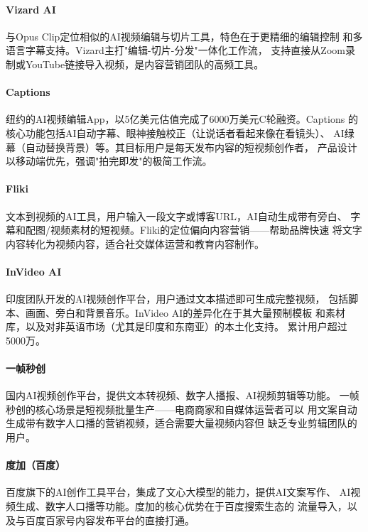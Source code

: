 \paragraph{Vizard AI}
与Opus Clip定位相似的AI视频编辑与切片工具，特色在于更精细的编辑控制
和多语言字幕支持。Vizard主打"编辑-切片-分发"一体化工作流，
支持直接从Zoom录制或YouTube链接导入视频，是内容营销团队的高频工具。

\paragraph{Captions}
纽约的AI视频编辑App，以5亿美元估值完成了6000万美元C轮融资。Captions
的核心功能包括AI自动字幕、眼神接触校正（让说话者看起来像在看镜头）、
AI绿幕（自动替换背景）等。其目标用户是每天发布内容的短视频创作者，
产品设计以移动端优先，强调"拍完即发"的极简工作流。

\paragraph{Fliki}
文本到视频的AI工具，用户输入一段文字或博客URL，AI自动生成带有旁白、
字幕和配图/视频素材的短视频。Fliki的定位偏向内容营销——帮助品牌快速
将文字内容转化为视频内容，适合社交媒体运营和教育内容制作。

\paragraph{InVideo AI}
印度团队开发的AI视频创作平台，用户通过文本描述即可生成完整视频，
包括脚本、画面、旁白和背景音乐。InVideo AI的差异化在于其大量预制模板
和素材库，以及对非英语市场（尤其是印度和东南亚）的本土化支持。
累计用户超过5000万。

\paragraph{一帧秒创}
国内AI视频创作平台，提供文本转视频、数字人播报、AI视频剪辑等功能。
一帧秒创的核心场景是短视频批量生产——电商商家和自媒体运营者可以
用文案自动生成带有数字人口播的营销视频，适合需要大量视频内容但
缺乏专业剪辑团队的用户。

\paragraph{度加（百度）}
百度旗下的AI创作工具平台，集成了文心大模型的能力，提供AI文案写作、
AI视频生成、数字人口播等功能。度加的核心优势在于百度搜索生态的
流量导入，以及与百度百家号内容发布平台的直接打通。




